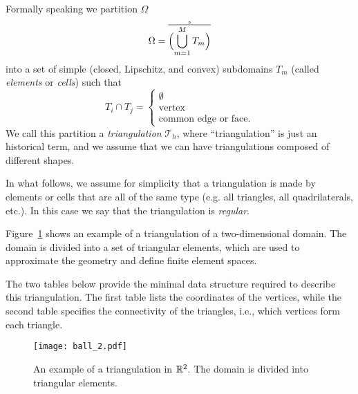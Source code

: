 Formally speaking we partition $\Omega$
\begin{equation*}
\Omega = \mathring{\overline{\Bigl(\bigcup_{m=1}^M T_m \Bigr)}}
\end{equation*}
into a set of simple (closed, Lipschitz, and convex) subdomains $T_m$ (called \emph{elements} or \emph{cells})
such that 
\begin{equation}
T_i \cap T_j = \begin{cases}\emptyset \\ \text{vertex} \\ \text{common edge or face}.\end{cases}
\end{equation}
We call this partition a \emph{triangulation} $\mathcal{T}_h$, where
``triangulation'' is just an historical term, and we assume that we can have
triangulations composed of different shapes.

In what follows, we assume for simplicity that a triangulation is made by
elements or cells that are all of the same type (e.g. all triangles, all
quadrilaterals, etc.). In this case we say that the triangulation is
\emph{regular}.

Figure~\ref{fig:triangulation} shows an example of a triangulation of a two-dimensional domain. The domain is divided into a set of triangular elements, which are used to approximate the geometry and define finite element spaces.

The two tables below provide the minimal data structure required to describe this triangulation. The first table lists the coordinates of the vertices, while the second table specifies the connectivity of the triangles, i.e., which vertices form each triangle.

\begin{figure}[!htb]
\centering
\texttt{[image: ball\_2.pdf]}
\caption{An example of a triangulation in $\mathbb{R}^2$. The domain is divided into triangular elements.}
\label{fig:triangulation}
\end{figure}


